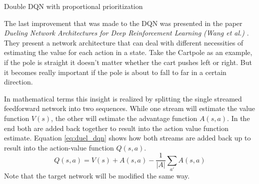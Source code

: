\begin{algorithm}[H]
  \caption{Double DQN with proportional prioritization}
  \label{alg:ddqn_per}
  \begin{algorithmic}[1]
        \EndFor
        \Let{$\theta$}{$\theta + \eta \cdot \Delta$}
      \EndIf
		\EndFor
	\EndFor
  \end{algorithmic}
\end{algorithm}

The last improvement that was made to the DQN was presented in the paper \emph{Dueling Network Architectures for Deep Reinforcement Learning (Wang et al.)} \cite{duel_dqn}.
They present a network architecture that can deal with different necessities of estimating the value for each action in a state.
Take the Cartpole as an example, if the pole is straight it doesn't matter whether the cart pushes left or right.
But it becomes really important if the pole is about to fall to far in a certain direction.


In mathematical terms this insight is realized by splitting the single streamed feedforward network into two sequences.
While one stream will estimate the value function $V(s)$, the other will estimate the advantage function $A(s,a)$.
In the end both are added back together to result into the action value function estimate.
Equation \ref{eq:duel_dqn} shows how both streams are added back up to result into the action-value function $Q(s,a)$.
\begin{equation} \label{eq:duel_dqn}
  Q(s,a) = V(s) + A(s,a) - \frac{1}{|A|}\sum_{a'}A(s,a)
\end{equation}
Note that the target network will be modified the same way.


